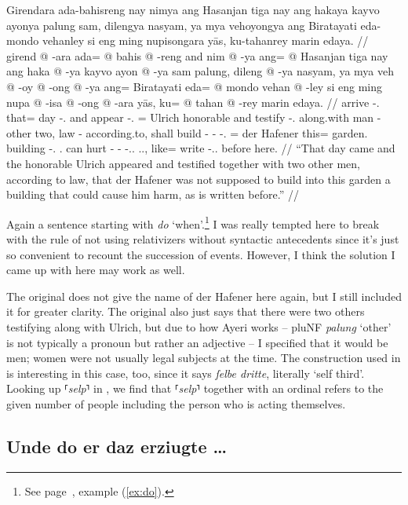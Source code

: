 \documentclass[12pt,paper=a4]{scrartcl}
\newcommand{\fw}[1]{\textit{#1}} %
\newcommand{\norm}[1]{⸢\textit{#1}⸣} %
\newcommand{\xayr}[3]{{\Tagati #1} \emph{#2} \enquote*{#3}}
\begin{document}
\ex \begingl
	\glpreamble Girendara ada-bahisreng nay nimya ang Hasanjan tiga nay ang 
		hakaya kayvo ayonya palung sam, dilengya nasyam, ya mya 
		vehoyongya ang Biratayati eda-mondo vehanley si eng ming 
		nupisongara yās, ku-tahanrey marin edaya. //
	\gla girend @ -ara ada= @ bahis @ -reng and nim @ -ya ang= @ Hasanjan 
		tiga nay ang haka @ -ya kayvo ayon @ -ya sam palung, dileng 
		@ -ya nasyam, ya mya veh @ -oy @ -ong @ -ya ang= Biratayati 
		eda= @ mondo vehan @ -ley si eng ming nupa @ -isa @ -ong @ -ara 
		yās, ku= @ tahan @ -rey marin edaya. //
	\glb arrive -\Tsg{}.\Inan{} that= day -\Aarg{}.\Inan{} and appear 
		-\Tsg{}.\M{} \Aarg{}= Ulrich honorable and \AgtT{} testify
		-\Tsg{}.\M{} along.with man -\Loc{} other two, law -\Loc{} 
		according.to, \LocT{} shall build -\Neg{} -\Irr{} -\Tsg{}.\M{} 
		\Aarg{}= {der Hafener} this= garden.\Top{} building 
		-\Parg{}.\Inan{} \Rel{} \AgtT{}.\Inan{} can hurt -\Caus{} 
		-\Irr{} -\Tsg{}.\Inan{}.\Top{} \Tsg{}.\M{}.\Parg{}, like= write 
		-\Tsg{}.\Inan{}.\Parg{} before here. //
	\glft \enquote{That day came and the honorable Ulrich appeared and 
		testified together with two other men, according to law, that 
		{der Hafener} was not supposed to build into this garden a 
		building that could cause him harm, as is written before.} //
\endgl \xe

Again a sentence starting with \fw{do} `when'.\footnote{See page~\pageref{ex:do},
example (\ref{ex:do}).} I was really tempted here to break with the rule of not 
using relativizers without syntactic antecedents since it's just so convenient 
to recount the succession of events. However, I think the solution I came up 
with here may work as well.

The \Mhg{} original does not give the name of der Hafener here again, but I 
still included it for greater clarity. The original also just says that there 
were two others testifying along with Ulrich, but due to how Ayeri works -- 
\xayr{pluNF}{palung}{other} is not typically a pronoun but rather an adjective
-- I specified that it would be men; women were not usually legal subjects at 
the time. The construction used in \Mhg{} is interesting in this case, too, 
since it says \fw{ſelbe dritte}, literally `self third'. Looking up \norm{selp} 
in \textcite{lexer}, we find that \norm{selp} together with an ordinal refers to 
the given number of people including the person who is acting themselves.

\subsection*{Unde do er daz erziugte …}
\end{document}
